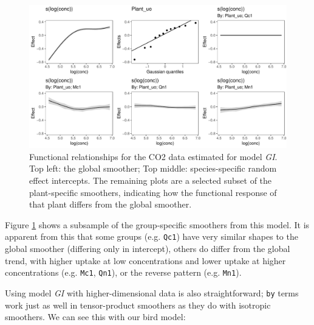 \documentclass[12pt]{article}
\begin{document}
\begin{figure}
\centering
\includegraphics{../figures/modGI_CO2-1.pdf}
\caption{\label{fig:co2_modGI}Functional relationships for the CO2 data
estimated for model \emph{GI}. Top left: the global smoother; Top
middle: species-specific random effect intercepts. The remaining plots
are a selected subset of the plant-specific smoothers, indicating how
the functional response of that plant differs from the global smoother.}
\end{figure}

Figure \ref{fig:co2_modGI} shows a subsample of the group-specific
smoothers from this model. It is apparent from this that some groups
(e.g. \texttt{Qc1}) have very similar shapes to the global smoother
(differing only in intercept), others do differ from the global trend,
with higher uptake at low concentrations and lower uptake at higher
concentrations (e.g. \texttt{Mc1}, \texttt{Qn1}), or the reverse pattern
(e.g. \texttt{Mn1}).

Using model \emph{GI} with higher-dimensional data is also
straightforward; \texttt{by} terms work just as well in tensor-product
smoothers as they do with isotropic smoothers. We can see this with our
bird model:
\end{document}
